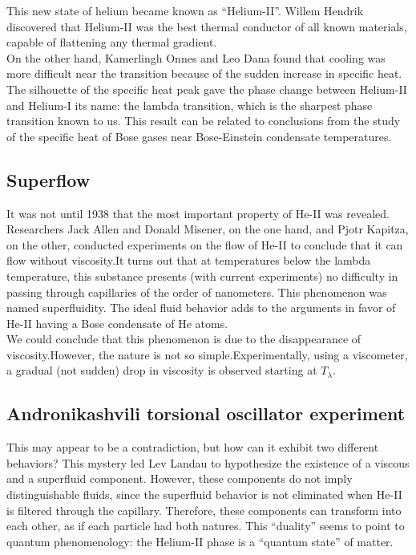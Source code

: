 \documentclass{article}
\begin{document}
This new state of helium became known as “Helium-II”. Willem Hendrik discovered that Helium-II was the best thermal conductor of all known materials, capable of flattening any thermal gradient. 
\\

On the other hand, Kamerlingh Onnes and Leo Dana found that cooling was more difficult near the transition because of the sudden increase in specific heat. The silhouette of the specific heat peak gave the phase change between Helium-II and Helium-I its name: the lambda transition, which is the sharpest phase transition known to us. This result can be related to conclusions from the study of the specific heat of Bose gases near Bose-Einstein condensate temperatures.
\\

\subsection{Superflow}

It was not until 1938 that the most important property of He-II was revealed.
Researchers Jack Allen and Donald Misener, on the one hand, and Pjotr Kapitza, on the other, conducted experiments on the flow of He-II to conclude that it can flow without viscosity.It turns out that at temperatures below the lambda temperature, this substance presents (with current experiments) no difficulty in passing through capillaries of the order of nanometers. This phenomenon was named superfluidity. The ideal fluid behavior adds to the arguments in favor of He-II having a Bose condensate of He atoms.
\\

We could conclude that this phenomenon is due to the disappearance of viscosity.However, the nature is not so simple.Experimentally, using a viscometer, a gradual (not sudden) drop in viscosity is observed starting at $T_\lambda$.
\\

\subsection{Andronikashvili torsional oscillator experiment}

This may appear to be a contradiction, but how can it exhibit two different behaviors? This mystery led Lev Landau to hypothesize the existence of a viscous and a superfluid component. However, these components do not imply distinguishable fluids, since the superfluid behavior is not eliminated when He-II is filtered through the capillary. Therefore, these components can transform into each other, as if each particle had both natures. This “duality” seems to point to quantum phenomenology: the Helium-II phase is a “quantum state” of matter.
\\
\end{document}

